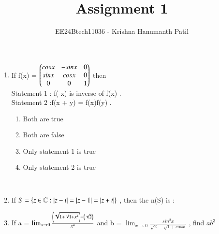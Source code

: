 \documentclass[journal,12pt,onecolumn]{IEEEtran}
\theoremstyle{remark}
\begin{document}
\title{Assignment 1}
\author{EE24Btech11036 - Krishna Hanumanth Patil}
\maketitle
\renewcommand{\thefigure}{\theenumi}
\renewcommand{\thetable}{\theenumi}
\begin{enumerate}

\item If f(x) = $ \begin{pmatrix}cosx & -sinx & 0 \\ sinx & cosx & 0 \\ 0 & 0 & 1 \end{pmatrix} $ then \\ Statement 1 : f(-x) is inverse of f(x) . \\ Statement 2 :f(x + y) = f(x)f(y) . 

\hfill{}
\begin{enumerate}
\item Both are true 
\item Both are false 
\item Only statement 1 is true 
\item Only statement 2 is true 
\end{enumerate}

\\ 

\item If $S=\left\{z\in\mathbb{C}:\left\vert z-i\right\vert=\left\vert z-1\right\vert=\left\vert z+i\right\vert\right\}$ , then the n(S) is :

\hfill{}
\begin{enumerate}
\end{enumerate}

\item If a = $ \lim_{x\to0}\frac{\left(\sqrt{1+\sqrt{1+x^4}}\right)-\left(\sqrt{2}\right)}{x^4} $ and  b = $ \lim_{x\to0}\frac{sin^2x}{\sqrt{2}-\sqrt{1+cosx}} $ , find $ ab^3 $

\hfill{}
\begin{enumerate}
\end{enumerate}


\end{enumerate}
\end{document}
